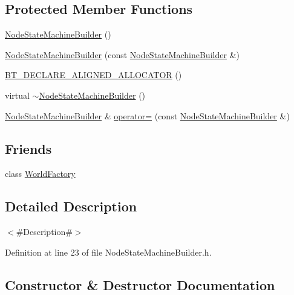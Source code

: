 \subsection*{Protected Member Functions}
\begin{DoxyCompactItemize}
\item 
\mbox{\hyperlink{classnjli_1_1_node_state_machine_builder_a90fbd3f716fa6adfceeb1e71adf75026}{Node\+State\+Machine\+Builder}} ()
\item 
\mbox{\hyperlink{classnjli_1_1_node_state_machine_builder_a918bae0356a70a1c815ee00f7c4589a2}{Node\+State\+Machine\+Builder}} (const \mbox{\hyperlink{classnjli_1_1_node_state_machine_builder}{Node\+State\+Machine\+Builder}} \&)
\item 
\mbox{\hyperlink{classnjli_1_1_node_state_machine_builder_a87fab3b6587a3aa00408b655b65d64da}{B\+T\+\_\+\+D\+E\+C\+L\+A\+R\+E\+\_\+\+A\+L\+I\+G\+N\+E\+D\+\_\+\+A\+L\+L\+O\+C\+A\+T\+OR}} ()
\item 
virtual \mbox{\hyperlink{classnjli_1_1_node_state_machine_builder_afa608c2c341b0bb1a84cdd11b6485e7c}{$\sim$\+Node\+State\+Machine\+Builder}} ()
\item 
\mbox{\hyperlink{classnjli_1_1_node_state_machine_builder}{Node\+State\+Machine\+Builder}} \& \mbox{\hyperlink{classnjli_1_1_node_state_machine_builder_ab9a6bcd9224410910230f1bb8568d8fe}{operator=}} (const \mbox{\hyperlink{classnjli_1_1_node_state_machine_builder}{Node\+State\+Machine\+Builder}} \&)
\end{DoxyCompactItemize}
\subsection*{Friends}
\begin{DoxyCompactItemize}
\item 
class \mbox{\hyperlink{classnjli_1_1_node_state_machine_builder_acb96ebb09abe8f2a37a915a842babfac}{World\+Factory}}
\end{DoxyCompactItemize}


\subsection{Detailed Description}
$<$\#\+Description\#$>$ 

Definition at line 23 of file Node\+State\+Machine\+Builder.\+h.



\subsection{Constructor \& Destructor Documentation}
\mbox{\label{classnjli_1_1_node_state_machine_builder_a90fbd3f716fa6adfceeb1e71adf75026}} 
